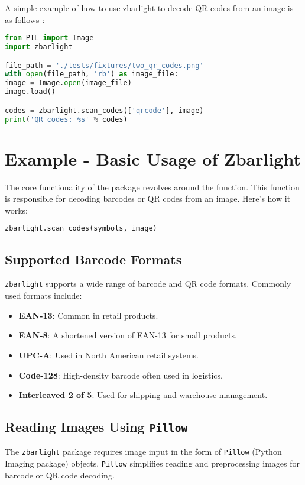 A simple example of how to use zbarlight to decode QR codes from an image is as follows \cite{zbarlightpypi:2024}: 

\begin{lstlisting}[language=Python]
from PIL import Image
import zbarlight

file_path = './tests/fixtures/two_qr_codes.png'
with open(file_path, 'rb') as image_file:
image = Image.open(image_file)
image.load()

codes = zbarlight.scan_codes(['qrcode'], image)
print('QR codes: %s' % codes)
\end{lstlisting}

\section{Example - Basic Usage of Zbarlight}
The core functionality of the 
 package revolves around the  function. This function is responsible for decoding barcodes or QR codes from an image. Here's how it works:\\

\begin{lstlisting}[language=Python]
	zbarlight.scan_codes(symbols, image)
\end{lstlisting}

\subsection{Supported Barcode Formats}
\texttt{zbarlight} supports a wide range of barcode and QR code formats. Commonly used formats include:

\begin{itemize}
	\item \textbf{EAN-13}: Common in retail products.
	\item \textbf{EAN-8}: A shortened version of EAN-13 for small products.
	\item \textbf{UPC-A}: Used in North American retail systems.
	\item \textbf{Code-128}: High-density barcode often used in logistics.
	\item \textbf{Interleaved 2 of 5}: Used for shipping and warehouse management.
\end{itemize}

\subsection{Reading Images Using \texttt{Pillow}}
The \texttt{zbarlight} package requires image input in the form of \texttt{Pillow} (Python Imaging package) objects. \texttt{Pillow} simplifies reading and preprocessing images for barcode or QR code decoding.

